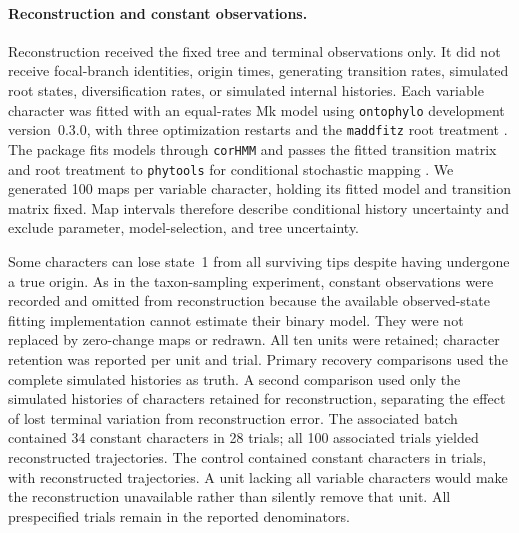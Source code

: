 \paragraph{Reconstruction and constant observations.}
Reconstruction received the fixed tree and terminal observations only.
It did not receive focal-branch identities, origin times, generating transition
rates, simulated root states, diversification rates, or simulated internal histories. Each variable character was fitted
with an equal-rates Mk model using \texttt{ontophylo} development version~0.3.0,
with three optimization restarts and the \texttt{maddfitz} root treatment
\citep{fitzjohn2009}. The package fits models through \texttt{corHMM} and
passes the fitted transition matrix and root treatment to \texttt{phytools}
for conditional stochastic mapping \citep{corHMM,revell2024}.
We generated 100 maps per variable character, holding its fitted model and
transition matrix fixed. Map intervals therefore describe conditional
history uncertainty and exclude parameter, model-selection, and tree uncertainty.

Some characters can lose state~1 from all surviving tips despite having
undergone a true origin. As in the taxon-sampling experiment, constant
observations were recorded and omitted from reconstruction because the
available observed-state fitting implementation cannot estimate their
binary model. They were not replaced by zero-change maps or redrawn.
All ten units were retained; character retention was reported per unit and
trial. Primary recovery comparisons used the complete simulated histories
as truth. A second comparison used only the simulated histories of characters
retained for reconstruction, separating the effect of lost terminal
variation from reconstruction error. The associated batch contained
34 constant characters in 28 trials; all 100 associated trials yielded
reconstructed trajectories. The control contained \NullConstants{} constant
characters in \NullConstantTrials{} trials, with \NullReconstructed{} reconstructed
trajectories. A unit lacking all variable characters would make the
reconstruction unavailable rather than silently remove that unit.
All prespecified trials remain in the reported denominators.


